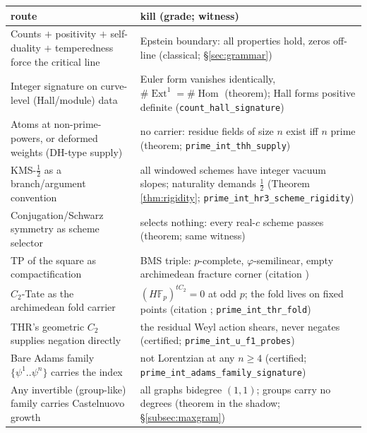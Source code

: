 \documentclass[11pt,reqno]{amsart}
\theoremstyle{plain}
\theoremstyle{definition}
\theoremstyle{remark}
\newcommand{\F}{\mathbb{F}}
\DeclareMathOperator{\Hom}{Hom}
\DeclareMathOperator{\Ext}{Ext}
\begin{document}
\begin{center}
\footnotesize
\begin{tabular}{>{\raggedright\arraybackslash}p{} >{\raggedright\arraybackslash}p{}}
\toprule
\textbf{route} & \textbf{kill (grade; witness)} \\
\midrule
Counts $+$ positivity $+$ self-duality $+$ temperedness force the critical line &
Epstein boundary: all properties hold, zeros off-line (classical; \S\ref{sec:grammar}) \\[2pt]
Integer signature on curve-level (Hall/module) data &
Euler form vanishes identically, $\#\Ext^1 = \#\Hom$ (theorem); Hall forms positive definite
(\texttt{count\_\allowbreak hall\_\allowbreak signature}) \\[2pt]
Atoms at non-prime-powers, or deformed weights (DH-type supply) &
no carrier: residue fields of size $n$ exist iff $n$ prime (theorem;
\texttt{prime\_\allowbreak int\_\allowbreak thh\_\allowbreak supply}) \\[2pt]
KMS-$\tfrac12$ as a branch/argument convention &
all windowed schemes have integer vacuum slopes; naturality demands $\tfrac12$ (Theorem
\ref{thm:rigidity}; \texttt{prime\_\allowbreak int\_\allowbreak hr3\_\allowbreak scheme\_\allowbreak rigidity}) \\[2pt]
Conjugation/Schwarz symmetry as scheme selector &
selects nothing: every real-$c$ scheme passes (theorem; same witness) \\[2pt]
TP of the square as compactification &
BMS triple: $p$-complete, $\varphi$-semilinear, empty archimedean fracture corner
(citation \cite{BMS18}) \\[2pt]
$C_2$-Tate as the archimedean fold carrier &
$(H\F_p)^{tC_2} = 0$ at odd $p$; the fold lives on fixed points (citation \cite{QS21,DMPR21};
\texttt{prime\_\allowbreak int\_\allowbreak thr\_\allowbreak fold}) \\[2pt]
THR's geometric $C_2$ supplies negation directly &
the residual Weyl action shears, never negates (certified;
\texttt{prime\_\allowbreak int\_\allowbreak u\_\allowbreak f1\_\allowbreak probes}) \\[2pt]
Bare Adams family $\{\psi^1..\psi^n\}$ carries the index &
not Lorentzian at any $n \ge 4$ (certified;
\texttt{prime\_\allowbreak int\_\allowbreak adams\_\allowbreak family\_\allowbreak signature}) \\[2pt]
Any invertible (group-like) family carries Castelnuovo growth &
all graphs bidegree $(1,1)$; groups carry no degrees (theorem in the shadow;
\S\ref{subsec:maxgram}) \\[2pt]

\end{tabular}
\end{center}
\end{document}

